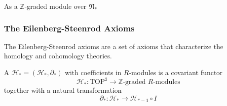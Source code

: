 \documentclass[a4paper,11pt]{article}
\begin{document}
As a \(\mathbb{Z}\)-graded module over \(\mathfrak{N}_\ast\)

\subsubsection{The Eilenberg-Steenrod Axioms}\label{es axioms}
The Eilenberg-Steenrod axioms are a set of axioms that characterize the homology and cohomology theories.

\begin{definition}
    A  \(\mathcal{H}_\ast=(\mathcal{H}_\ast,\partial_\ast)\) with coefficients in \(R\)-modules is a covariant functor\[\mathcal{H}_\ast:\mathrm{TOP}^2\to\mathbb{Z}\text{-graded }R\text{-modules}\]
    together with a natural transformation \[\partial_\ast:\mathcal{H}_\ast\to\mathcal{H}_{\ast-1}\circ I\]
    

\end{definition}
\end{document}
